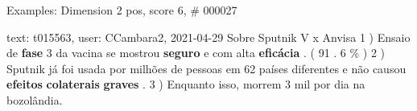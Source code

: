 \begin{frame}{Examples: Dimension 2 pos, score 6, \# 000027}
\footnotesize
\begin{exampleblock}{text: t015563, user: CCambara2, 2021-04-29}
Sobre Sputnik V x Anvisa 1 ) Ensaio de \textbf{fase} 3 da vacina se mostrou 
\textbf{seguro} e com alta \textbf{eficácia} . ( 91 . 6 \% ) 2 ) Sputnik já foi 
usada por milhões de pessoas em 62 países diferentes e não causou 
\textbf{efeitos} \textbf{colaterais} \textbf{graves} . 3 ) Enquanto isso, 
morrem 3 mil por dia na bozolândia. 
\end{exampleblock}
\end{frame}
